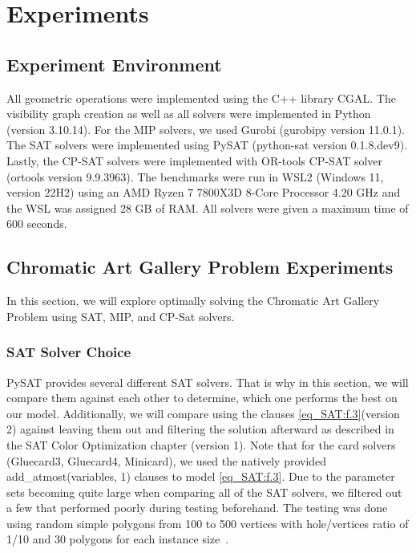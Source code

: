 \chapter{Experiments}
\section{Experiment Environment}
All geometric operations were implemented using the C++ library CGAL. The visibility graph creation as well as all solvers were implemented in Python (version 3.10.14). For the MIP solvers, we used Gurobi (gurobipy version 11.0.1). The SAT solvers were implemented using PySAT (python-sat version 0.1.8.dev9). Lastly, the CP-SAT solvers were implemented with OR-tools CP-SAT solver (ortools version 9.9.3963).
The benchmarks were run in WSL2 (Windows 11, version 22H2) using an AMD Ryzen 7 7800X3D 8-Core Processor 4.20 GHz and the WSL was assigned 28 GB of RAM. All solvers were given a maximum time of 600 seconds.

\section{Chromatic Art Gallery Problem Experiments}
In this section, we will explore optimally solving the Chromatic Art Gallery Problem using SAT, MIP, and CP-Sat solvers.

\subsection{SAT Solver Choice}
PySAT provides several different SAT solvers. That is why in this section, we will compare them against each other to determine, which one performs the best on our model. Additionally, we will compare using the clauses \cref{eq_SAT:f.3}(version 2) against leaving them out and filtering the solution afterward as described in the SAT Color Optimization chapter (version 1). Note that for the card solvers (Gluecard3, Gluecard4, Minicard), we used the natively provided add\_atmost(variables, 1) clauses to model \cref{eq_SAT:f.3}. Due to the parameter sets becoming quite large when comparing all of the SAT solvers, we filtered out a few that performed poorly during testing beforehand. The testing was done using random simple polygons from 100 to 500 vertices with hole/vertices ratio of 1/10 and 30 polygons for each instance size~\cite{wireless-localization-instances-page}.

